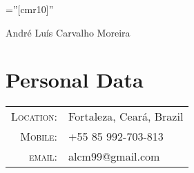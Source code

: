 \documentclass[a4paper,10pt]{article}
\begin{document}

\pagestyle{empty} %

\font\fb=''[cmr10]'' %

\par{\centering
		{\Huge André Luís \Huge{Carvalho} Moreira
	}\bigskip\par}

\section{Personal Data}

\begin{tabular}{rl}
    \textsc{Location:}   & Fortaleza, Ceará, Brazil \\
    \textsc{Mobile:}     & +55 85 992-703-813\\
    \textsc{email:}     & {alcm99@gmail.com}
\end{tabular} \\

\end{document}
